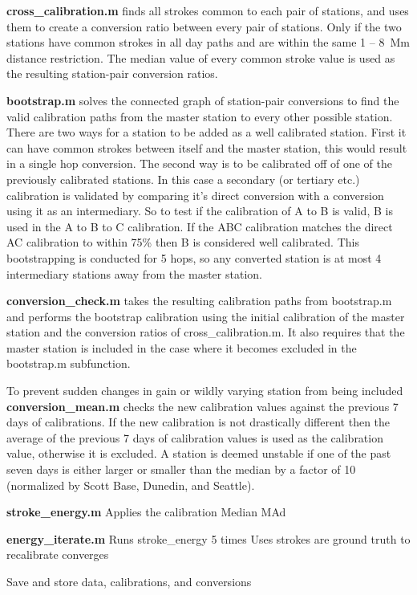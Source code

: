 {\bf cross\_calibration.m} finds all strokes common to each pair of stations, and uses them to create a conversion ratio between every pair of stations.
Only if the two stations have common strokes in all day paths and are within the same 1 -- 8~Mm distance restriction.
The median value of every common stroke value is used as the resulting station-pair conversion ratios.

{\bf bootstrap.m} solves the connected graph of station-pair conversions to find the valid calibration paths from the master station to every other possible station.
There are two ways for a station to be added as a well calibrated station.
First it can have common strokes between itself and the master station, this would result in a single hop conversion.
The second way is to be calibrated off of one of the previously calibrated stations.
In this case a secondary (or tertiary etc.) calibration is validated by comparing it's direct conversion with a conversion using it as an intermediary.
So to test if the calibration of A to B is valid, B is used in the A to B to C calibration.
If the ABC calibration matches the direct AC calibration to within 75\% then B is considered well calibrated.
This bootstrapping is conducted for 5 hops, so any converted station is at most 4 intermediary stations away from the master station.

{\bf conversion\_check.m} takes the resulting calibration paths from bootstrap.m and performs the bootstrap calibration using the initial calibration of the master station and the conversion ratios of cross\_calibration.m.
It also requires that the master station is included in the case where it becomes excluded in the bootstrap.m subfunction.

To prevent sudden changes in gain or wildly varying station from being included {\bf conversion\_mean.m} checks the new calibration values against the previous 7 days of calibrations.
If the new calibration is not drastically different then the average of the previous 7 days of calibration values is used as the calibration value, otherwise it is excluded.
A station is deemed unstable if one of the past seven days is either larger or smaller than the median by a factor of 10 (normalized by Scott Base, Dunedin, and Seattle).

{\bf stroke\_energy.m}
Applies the calibration
Median
MAd

{\bf energy\_iterate.m}
Runs stroke\_energy 5 times
Uses strokes are ground truth to recalibrate
converges

Save and store data, calibrations, and conversions

